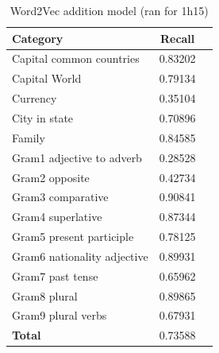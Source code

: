 \label{sec:tabellen}
\begin{center}
    \begin{table}[h!]
        \begin{tabular}{| l | c | r}
        	\hline
        	\textbf{Category} &    \textbf{Recall}\\ \hline
        	Capital common countries 	& 0.83202 \\
        	Capital World 				& 0.79134 \\
        	Currency					& 0.35104 \\
        	City in state				& 0.70896 \\
        	Family 						& 0.84585 \\
        	Gram1 adjective to adverb 	& 0.28528 \\
        	Gram2 opposite 				& 0.42734 \\
        	Gram3 comparative 			& 0.90841 \\
        	Gram4 superlative 			& 0.87344 \\
        	Gram5 present participle	& 0.78125 \\
        	Gram6 nationality adjective & 0.89931 \\
        	Gram7 past tense 			& 0.65962 \\
        	Gram8 plural 				& 0.89865 \\
        	Gram9 plural verbs 			& 0.67931 \\
        	\textbf{Total}				& 0.73588 \\ \hline
        \end{tabular}
    \caption{Word2Vec addition model (ran for 1h15)}
    \label{table:word2vec_addition}
    \end{table}
    

\end{center}
